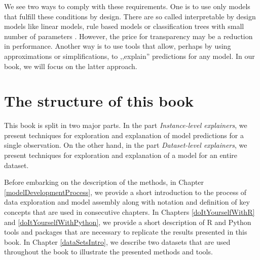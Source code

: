 \documentclass[]{krantz}
\begin{document}
We see two ways to comply with these requirements. One is to use only models that fulfill these conditions by design. There are so called interpretable by design models like linear models, rule based models or classification trees with small number of parameters \citep{molnar2019}. However, the price for transparency may be a reduction in performance. Another way is to use tools that allow, perhaps by using approximations or simplifications, to ,,explain'' predictions for any model. In our book, we will focus on the latter approach.

\hypertarget{bookstructure}{%
\section{The structure of this book}\label{bookstructure}}

This book is split in two major parts. In the part \emph{Instance-level explainers}, we present techniques for exploration and explanation of model predictions for a single observation. On the other hand, in the part \emph{Dataset-level explainers}, we present techniques for exploration and explanation of a model for an entire dataset.

Before embarking on the description of the methods, in Chapter
\ref{modelDevelopmentProcess}, we provide a short introduction to the process of data exploration and model assembly along with notation and definition of key concepts that are used in consecutive chapters.
In Chapters \ref{doItYourselfWithR} and \ref{doItYourselfWithPython}, we provide a short description of R and Python tools and packages that are necessary to replicate the results presented in this book. In Chapter \ref{dataSetsIntro}, we describe two datasets that are used throughout the book to illustrate the presented methods and tools.
\end{document}
